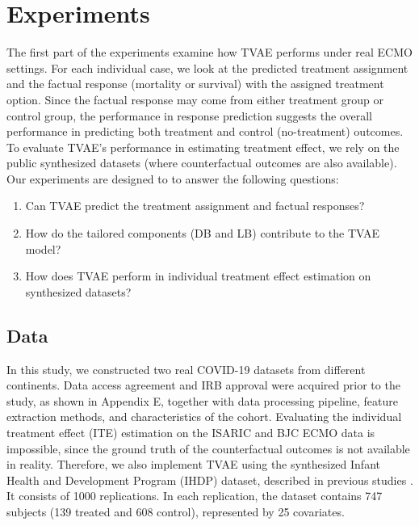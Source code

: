 \section{Experiments}
The first part of the experiments examine how TVAE performs under real ECMO settings. For each individual case, we look at the predicted treatment assignment and the factual response (mortality or survival) with the assigned treatment option. Since the factual  response may come from either treatment group or control group, the performance in response prediction suggests the overall performance in predicting both treatment and control (no-treatment) outcomes. 
To evaluate TVAE's performance in estimating treatment effect, we rely on the public synthesized datasets (where counterfactual outcomes are also available). Our experiments are designed to to answer the following questions: 
\begin{enumerate}
    \item Can TVAE predict the treatment assignment and factual responses? 
    \item How do the tailored components (DB and LB) contribute to the TVAE model? 
    \item How does TVAE perform in individual treatment effect estimation on synthesized datasets?     
\end{enumerate}



\subsection{Data}
In this study, we constructed two real COVID-19 datasets from different continents. Data access agreement and IRB approval were acquired prior to the study, as shown in Appendix E, together with data processing pipeline, feature extraction methods, and characteristics of the cohort. Evaluating the individual treatment effect (ITE) estimation on the ISARIC and BJC ECMO data is impossible, since the ground truth of the counterfactual outcomes is not available in reality. Therefore, we also implement TVAE using the synthesized Infant Health and Development Program (IHDP) dataset, described in previous studies \cite{louizos2017cevae,chipman2010bart,wager2018cf,shalit2017cfrnet,shi2019adapting}. It consists of 1000 replications. In each replication, the dataset contains 747 subjects (139 treated and
608 control), represented by 25 covariates.

